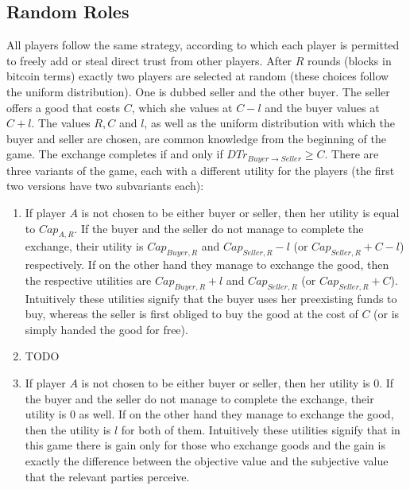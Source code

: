 \subsection{Random Roles}
  All players follow the same strategy, according to which each player is permitted to freely add or steal direct trust from
  other players. After $R$ rounds (blocks in bitcoin terms) exactly two players are selected at random (these choices follow
  the uniform distribution). One is dubbed seller and the other buyer. The seller offers a good that costs $C$, which she
  values at $C - l$ and the buyer values at $C + l$. The values $R, C$ and $l$, as well as the uniform distribution with which
  the buyer and seller are chosen, are common knowledge from the beginning of the game. The exchange completes if and only if
  $DTr_{Buyer \rightarrow Seller} \geq C$. There are three variants of the game, each with a different utility for the
  players (the first two versions have two subvariants each):

  \begin{enumerate}
    \item If player $A$ is not chosen to be either buyer or seller, then her utility is equal to $Cap_{A, R}$. If the buyer
    and the seller do not manage to complete the exchange, their utility is $Cap_{Buyer, R}$ and $Cap_{Seller, R} - l$ (or
    $Cap_{Seller, R} + C - l$) respectively. If on the other hand they manage to exchange the good, then the respective
    utilities are $Cap_{Buyer, R} + l$ and $Cap_{Seller, R}$ (or $Cap_{Seller, R} + C$). Intuitively these utilities signify
    that the buyer uses her preexisting funds to buy, whereas the seller is first obliged to buy the good at the cost of $C$
    (or is simply handed the good for free).
    
    \item TODO

    \item If player $A$ is not chosen to be either buyer or seller, then her utility is 0. If the buyer and the seller do not
    manage to complete the exchange, their utility is 0 as well. If on the other hand they manage to exchange the good, then
    the utility is $l$ for both of them. Intuitively these utilities signify that in this game there is gain only for those
    who exchange goods and the gain is exactly the difference between the objective value and the subjective value that the
    relevant parties perceive.
  \end{enumerate}

